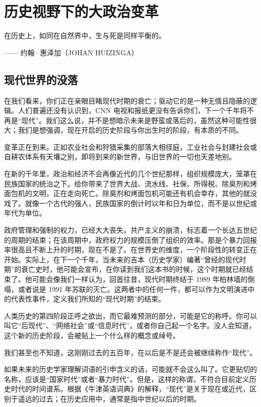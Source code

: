 \chapter[大政治变革]{历史视野下的大政治变革}

\begin{tcolorbox}
在历史上，如同在自然界中，生与死是同样平衡的。
\begin{flushright}
    —— 约翰·惠泽加（JOHAN HUIZINGA）
\end{flushright}
\end{tcolorbox}

\section{现代世界的没落}
在我们看来，你们正在亲眼目睹现代时期的衰亡；驱动它的是一种无情且隐蔽的逻辑。人们普遍还没有认识到，CNN 电视和报纸更没有告诉你们，下一个千年将不再是“现代”。我们这么说，并不是想暗示未来是野蛮或落后的，虽然这种可能性很大；我们是想强调，现在开启的历史阶段与你出生时的阶段，有本质的不同。

变革正在到来。正如农业社会和狩猎采集的部落大相径庭，工业社会与封建社会或自耕农体系有天壤之别，即将到来的新世界，与旧世界的一切也天差地别。

在新的千年里，政治和经济不会再像近代的几个世纪那样，组织规模庞大，笼罩在民族国家的统治之下。给你带来了世界大战、流水线、社保、所得税、除臭剂和烤面包机的文明，正在走向死亡。除臭剂和烤面包机可能还有机会幸存，其他的就没戏了。就像一个古代的强人，民族国家的倒计时以年和日为单位，而不是以世纪或年代为单位。

政府管理和强制的权力，已经大大丧失。共产主义的崩溃，标志着一个长达五世纪的周期的结束；在该周期中，政府权力的规模压倒了组织的效率。那是个暴力回报率很高且不断上升的时期，现在不是了。在世界史的维度，一个阶段性的转变正在开始。实际上，在下一个千年，当未来的吉本（历史学家）编著“曾经的现代时期”的衰亡史时，他可能会宣布，在你读到我们这本书的时候，这个时期就已经结束了。他可能会像我们一样认为，回首往昔，现代时期终结于 1989 年柏林墙的倒塌，或者说是 1991 年苏联的灭亡。这两者中的任何一件，都可以作为文明演进中的代表性事件，定义我们所知的“现代时期”的结束。

人类历史的第四阶段正呼之欲出，而它最难预测的部分，可能是它的称呼。你可以叫它“后现代”、“网络社会”或“信息时代”，或者你自己起一个名字。没人会知道，这个新的历史阶段，会被贴上一个什么样的概念或绰号。

我们甚至也不知道，这刚刚过去的五百年，在以后是不是还会被继续称作“现代”。

如果未来的历史学家理解词语的引申含义的话，可能就不会这么叫了。它更贴切的名称，应该是“国家时代”或者“暴力时代”。但是，这样的称谓，不符合目前定义历史时代的时间谱系。根据《牛津英语词典》的解释，“现代”是关于现在或近代，区别于遥远的过去；在历史应用中，通常是指中世纪以后的时期。


